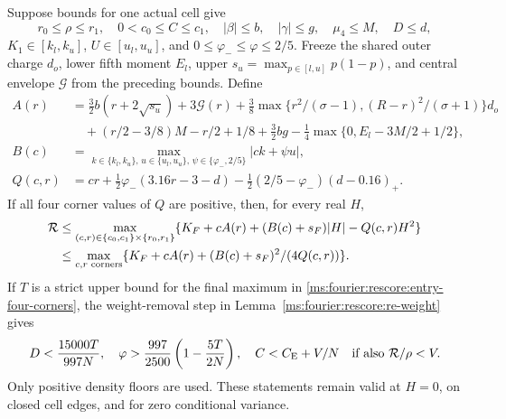 \begin{lemma}\label{ms:fourier:rescore:entry-cell-theorem}\label{ms:fourier:rescore:entry-corners}
Suppose bounds for one actual cell give
\[
 r_0\le\rho\le r_1,\quad0<c_0\le C\le c_1,\quad
 |\beta|\le b,\quad |\gamma|\le g,\quad \mu_4\le M,\quad D\le d,
\]
$K_1\in[k_l,k_u]$, $U\in[u_l,u_u]$, and
$0\le\varphi_-\le\varphi\le2/5$. Freeze the shared outer charge $d_o$,
lower fifth moment $E_l$, upper $s_u=\max_{p\in[l,u]}p(1-p)$, and
central envelope $\mathcal G$ from the preceding bounds.
Define
\begin{align*}
 A(r)&=\tfrac32 b(r+2\sqrt{s_u})+3\mathcal G(r)
 +\tfrac38\max\{r^2/(\sigma-1),(R-r)^2/(\sigma+1)\}d_o\\
 &\quad +(r/2-3/8)M-r/2+1/8+\tfrac32bg
 -\tfrac14\max\{0,E_l-3M/2+1/2\},\\
 B(c)&=\max_{k\in\{k_l,k_u\},\,u\in\{u_l,u_u\},\,
                      \psi\in\{\varphi_-,2/5\}}|ck+\psi u|,\\
 Q(c,r)&=cr+\tfrac12\varphi_-(3.16r-3-d)
       -\tfrac12(2/5-\varphi_-)(d-0.16)_+.
\end{align*}
If all four corner values of $Q$ are positive, then, for every real $H$,
\begin{align}
 \mathcal R&\le\max_{(c,r)\in\{c_0,c_1\}\times\{r_0,r_1\}}
       \{K_F+cA(r)+(B(c)+s_F)|H|-Q(c,r)H^2\}\notag\\
 &\le\max_{c,r\text{ corners}}
       \{K_F+cA(r)+(B(c)+s_F)^2/(4Q(c,r))\}.           \label{ms:fourier:rescore:entry-four-corners}
\end{align}
If $T$ is a strict upper bound for the final maximum in
\eqref{ms:fourier:rescore:entry-four-corners}, the weight-removal step in
Lemma~\ref{ms:fourier:rescore:re-weight} gives
\begin{equation}\label{ms:fourier:rescore:entry-feedback-values}
 D<\frac{15000T}{997N},\quad
 \varphi>\frac{997}{2500}\left(1-\frac{5T}{2N}\right),\quad
 C<C_{\mathrm E}+V/N\quad\text{if also }\mathcal R/\rho<V.
\end{equation}
Only positive density floors are used. These statements remain valid at
$H=0$, on closed cell edges, and for zero conditional variance.
\end{lemma}
